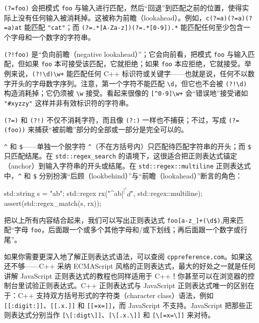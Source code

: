 \texttt{(\allowbreak{}?=foo)\allowbreak{}} 会把模式 \texttt{foo} 与输入进行匹配，然后“回退”到匹配之前的位置，使得实际上没有任何输入被消耗掉。这被称为前瞻（lookahead）。例如，\texttt{c(\allowbreak{}?=a)\allowbreak{}(\allowbreak{}?=a)\allowbreak{}(\allowbreak{}?=a)\allowbreak{}at} 能匹配 \texttt{"cat"}；而 \texttt{(\allowbreak{}?=.*[A-Za-z])\allowbreak{}(\allowbreak{}?=.*[0-9])\allowbreak{}.*} 能匹配任何至少包含一个字母和一个数字的字符串。

\texttt{(\allowbreak{}?!foo)\allowbreak{}} 是“负向前瞻（negative lookahead）”；它会向前看，把模式 \texttt{foo} 与输入匹配，但如果 \texttt{foo} 本可接受该匹配，它就拒绝；如果 \texttt{foo} 本应拒绝，它就接受。举例来说，\texttt{(?!\textbackslash{}d)\textbackslash{}w+} 能匹配任何 C++ 标识符或关键字——也就是说，任何不以数字开头的字母数字序列。注意，第一个字符不能匹配 \texttt{\textbackslash{}d}，但它也不会被 \texttt{(?!\textbackslash{}d)} 构造消耗掉；它仍须被 \texttt{\textbackslash{}w} 接受。看起来很像的 \texttt{[{\textasciicircum{}}0-9]\textbackslash{}w+} 会“错误地”接受诸如 \texttt{"\#xyzzy"} 这样并非有效标识符的字符串。

\texttt{(\allowbreak{}?=)\allowbreak{}} 和 \texttt{(\allowbreak{}?!)\allowbreak{}} 不仅不消耗字符，而且像 \texttt{(\allowbreak{}?:)\allowbreak{}} 一样也不捕获；不过，写成 \texttt{(\allowbreak{}?=(\allowbreak{}foo)\allowbreak{})\allowbreak{}} 来捕获“被前瞻”部分的全部或一部分是完全可以的。

\texttt{\textasciicircum{}} 和 \texttt{\$}——单独一个脱字符 \texttt{\textasciicircum{}}（不在方括号内）只匹配待匹配字符串的开头；而 \texttt{\$} 只匹配结尾。在 \texttt{std::\allowbreak{}regex\_\allowbreak{}search} 的语境下，这很适合把正则表达式锚定（anchor）到输入字符串的开头或结尾。在 \texttt{std::\allowbreak{}regex::\allowbreak{}multiline} 正则表达式中，\texttt{\textasciicircum{}} 和 \texttt{\$} 分别扮演“后顾（lookbehind）”与“前瞻（lookahead）”断言的角色：

\begin{codebox}[cpp]
    std::string s = "ab\ncd";
    std::regex rx("^ab$[^]^cd$", std::regex::multiline);
    assert(std::regex_match(s, rx));
\end{codebox}

把以上所有内容结合起来，我们可以写出正则表达式 \texttt{foo[a-z\_\allowbreak{}]+(\textbackslash{}d\textbar\$)},用来匹配“字母 \texttt{foo}，后面跟一个或多个其他字母和/或下划线；再后面跟一个数字或行尾”。

如果你需要更深入地了解正则表达式语法，可以查阅 \texttt{cppreference.\allowbreak{}com}。如果这还不够——C++ 采纳 ECMAScript 风格的正则表达式，最大的好处之一就是任何讲解 JavaScript 正则表达式的教程也同样适用于 C++！你甚至可以在浏览器的控制台里试验正则表达式。C++ 正则表达式与 JavaScript 正则表达式唯一的区别在于：C++ 支持双方括号形式的字符类（character class）语法，例如 \texttt{[[:digit:]]}、\texttt{[[.x.]]} 和 \texttt{[[=x=]]}，而 JavaScript 不支持。JavaScript 把那些正则表达式分别当作 \texttt{[\textbackslash{}[:digt\textbackslash{}]]}、\texttt{[\textbackslash{}[.x.\textbackslash{}]]} 和 \texttt{[\textbackslash{}[=x=\textbackslash{}]]} 来对待。

